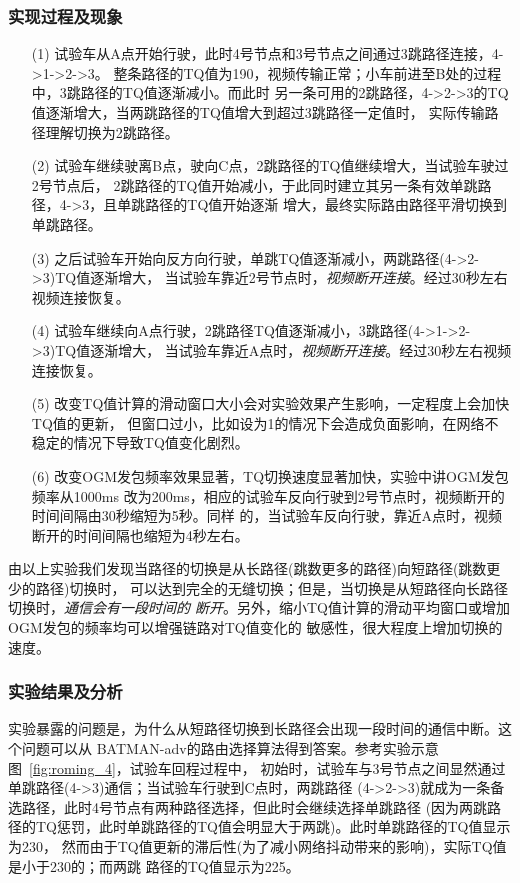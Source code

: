 \subsubsection{实现过程及现象}
\begin{itemize}
\item[(1)] 试验车从A点开始行驶，此时4号节点和3号节点之间通过3跳路径连接，4->1->2->3。
整条路径的TQ值为190，视频传输正常；小车前进至B处的过程中，3跳路径的TQ值逐渐减小。而此时
另一条可用的2跳路径，4->2->3的TQ值逐渐增大，当两跳路径的TQ值增大到超过3跳路径一定值时，
实际传输路径理解切换为2跳路径。
\item[(2)] 试验车继续驶离B点，驶向C点，2跳路径的TQ值继续增大，当试验车驶过2号节点后，
2跳路径的TQ值开始减小，于此同时建立其另一条有效单跳路径，4->3，且单跳路径的TQ值开始逐渐
增大，最终实际路由路径平滑切换到单跳路径。
\item[(3)] 之后试验车开始向反方向行驶，单跳TQ值逐渐减小，两跳路径(4->2->3)TQ值逐渐增大，
当试验车靠近2号节点时，\emph{视频断开连接}。经过30秒左右视频连接恢复。
\item[(4)] 试验车继续向A点行驶，2跳路径TQ值逐渐减小，3跳路径(4->1->2->3)TQ值逐渐增大，
当试验车靠近A点时，\emph{视频断开连接}。经过30秒左右视频连接恢复。
\item[(5)] 改变TQ值计算的滑动窗口大小会对实验效果产生影响，一定程度上会加快TQ值的更新，
但窗口过小，比如设为1的情况下会造成负面影响，在网络不稳定的情况下导致TQ值变化剧烈。
\item[(6)] 改变OGM发包频率效果显著，TQ切换速度显著加快，实验中讲OGM发包频率从1000ms
改为200ms，相应的试验车反向行驶到2号节点时，视频断开的时间间隔由30秒缩短为5秒。同样
的，当试验车反向行驶，靠近A点时，视频断开的时间间隔也缩短为4秒左右。
\end{itemize}
由以上实验我们发现当路径的切换是从长路径(跳数更多的路径)向短路径(跳数更少的路径)切换时，
可以达到完全的无缝切换；但是，当切换是从短路径向长路径切换时，\emph{通信会有一段时间的
断开}。另外，缩小TQ值计算的滑动平均窗口或增加OGM发包的频率均可以增强链路对TQ值变化的
敏感性，很大程度上增加切换的速度。

\subsubsection{实验结果及分析}
实验暴露的问题是，为什么从短路径切换到长路径会出现一段时间的通信中断。这个问题可以从
BATMAN-adv的路由选择算法得到答案。参考实验示意图~\ref{fig:roming_4}，试验车回程过程中，
初始时，试验车与3号节点之间显然通过单跳路径(4->3)通信；当试验车行驶到C点时，两跳路径
(4->2->3)就成为一条备选路径，此时4号节点有两种路径选择，但此时会继续选择单跳路径
(因为两跳路径的TQ惩罚，此时单跳路径的TQ值会明显大于两跳)。此时单跳路径的TQ值显示为230，
然而由于TQ值更新的滞后性(为了减小网络抖动带来的影响)，实际TQ值是小于230的；而两跳
路径的TQ值显示为225。

